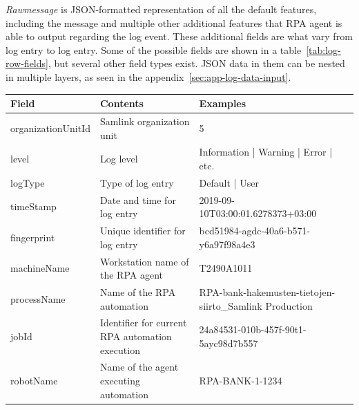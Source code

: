\textit{Rawmessage} is JSON-formatted representation
of all the default features,
including the message
and multiple other additional features
that RPA agent is able to output regarding the log event.
These additional fields are what vary from log entry to log entry.
Some of the possible fields are shown in a table~\ref{tab:log-row-fields},
but several other field types exist.
JSON data in them can be nested in multiple layers,
as seen in the appendix~\ref{sec:app-log-data-input}.

\begin{table}[]
    \centering
    \begin{tabular}{|L{0.25\textwidth}|L{0.25\textwidth}|L{0.5\textwidth}|}
        \hline
        \textbf{Field}    & \textbf{Contents}                               & \textbf{Examples}                                                             \\ \hline
        organizationUnitId & Samlink organization unit                       & 5                                                                            \\ \hline
        level              & Log level                                       & Information | Warning | Error | etc.                                         \\ \hline
        logType            & Type of log entry                               & Default | User                                                               \\ \hline
        timeStamp          & Date and time for log entry                     & 2019-09-10T03:00:01.6278373+03:00                                            \\ \hline
        fingerprint        & Unique identifier for log entry                 & bcd51984-agdc-40a6-b571-y6a97f98a4e3                                         \\ \hline
        machineName        & Workstation name of the RPA agent               & T2490A1011                                                                   \\ \hline
        processName        & Name of the RPA automation                      & RPA-bank-hakemusten-tietojen-siirto\_Samlink Production                      \\ \hline
        jobId              & Identifier for current RPA automation execution & 24a84531-010b-457f-90t1-5ayc98d7b557                                         \\ \hline
        robotName          & Name of the agent executing automation          & RPA-BANK-1-1234                                                              \\ \hline

\end{tabular}
\end{table}
